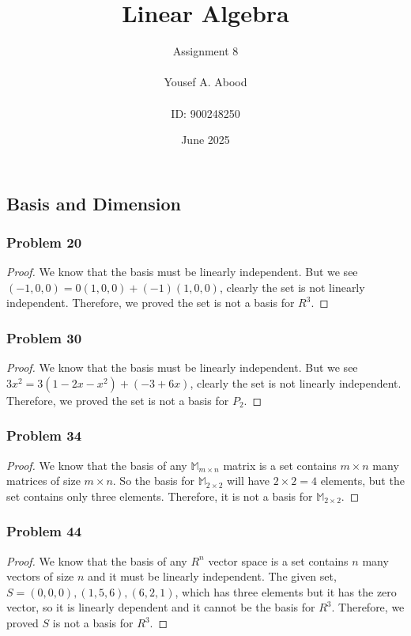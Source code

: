 \documentclass[a4paper,12pt]{article}
\title{Linear Algebra}
\author{Assignment 8\\ \\ Yousef A. Abood\\ \\ ID: 900248250}
\date{June 2025}
\begin{document}
\maketitle
\noindent\makebox[\linewidth]{\rule{15cm}{0.4pt}}

\subsection{Basis and Dimension}
\subsubsection*{Problem 20}
\begin{proof}
    We know that the basis must be linearly independent. But we see $(-1,0,0)=0(1,0,0)+(-1)(1,0,0)$, clearly the set is not linearly independent. Therefore, we proved the set is not a basis for $R^3.$
\end{proof}
\subsubsection*{Problem 30}
\begin{proof}
    We know that the basis must be linearly independent. But we see $3x^2=3(1-2x-x^2)+(-3+6x)$, clearly the set is not linearly independent. Therefore, we proved the set is not a basis for $P_2.$
\end{proof}
\subsubsection*{Problem 34}
\begin{proof}
    We know that the basis of any $\mathbb{M}_{m\times n}$ matrix is a set contains $m \times n$ many matrices of size $m \times n$. So the basis for $\mathbb{M}_{2\times 2}$ will have $2 \times 2 =4$ elements, but the set contains only three elements. Therefore, it is not a basis for $\mathbb{M}_{2\times 2}.$
\end{proof}
\subsubsection*{Problem 44}
\begin{proof}
    We know that the basis of any $R^n$ vector space is a set contains $n$ many vectors of size $n$ and it must be linearly independent. The given set, $S={(0,0,0),(1,5,6),(6,2,1)}$, which has three elements but it has the zero vector, so it is linearly dependent and it cannot be the basis for $R^3$. Therefore, we proved $S$ is not a basis for $R^3.$
\end{proof}
\end{document}
